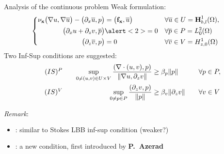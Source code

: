 \begin{frame}{Analysis of the continuous problem}
Weak formulation:
\begin{equation*}
  \left\{
    \begin{aligned}
      \visc_\xx\big(\grad u,\grad\bu\big)
      -\big(\divx\bu, p\big) &= \big(\ff_\xx,\bu\big) && \forall
      \bu\in \UU=\Uspace,
      \\
      \big(\divx \uu + \dz v,\bp\big) & \alert<2>{= 0} &&
      \forall\bp\in \PP=\Pspace
      \\
      \big(\dz \bv, p\big) & =0 &&
      \forall\bv\in \VV=\Vspace
    \end{aligned}
  \right.
\end{equation*}
\pause
Two Inf-Sup conditions are suggested:
\begin{alignat*}{4}
  \label{eq:ISp}
  \tag*{\ensuremath{(IS)^\PP}\xspace}
  &\quad&
  \sup_{0\neq(\uu,\vv)\in \UU \times \VV}
  \frac{(\div(\uu,\vv),\pp)}{\|\grad \uu,\dz \vv\|}
  &\ge \ConstISp \|\pp\|
  &\quad&
  \forall \pp \in \PP,
  \\
  \label{eq:ISv}
  \tag*{\ensuremath{(IS)^\VV}\xspace}
  &\quad &
  \sup_{0\neq \pp \in \PP}
  \frac{(\dz \vv,\pp)}{\|\pp\|}
  &\ge \ConstISv \|\dz\vv\|
  &\quad&
  \forall \vv\in \VV
\end{alignat*}

\textit{Remark}:
  \begin{itemize}
  \item \ISp: similar to Stokes LBB
    inf-sup condition (weaker?)~\cite{Brezzi-Fortin:91}
  \item \ISv: a new condition, first introduced by
    \textbf{P.~Azerad}~\cite{Azerad:1994,Azerad:PhD:96}
  \end{itemize}
\bigskip~
\end{frame}


